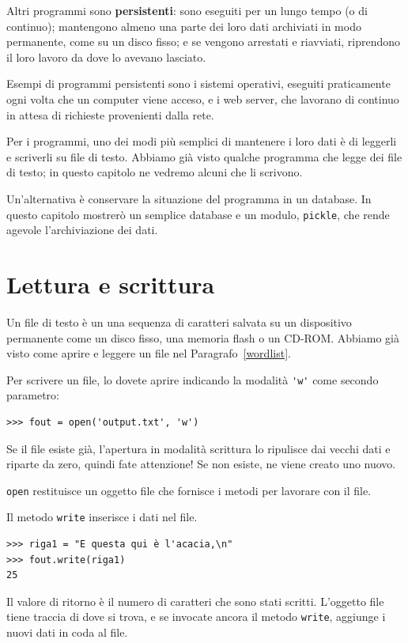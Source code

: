 \documentclass[10pt]{book}
\begin{document}
Altri programmi sono {\bf persistenti}: sono eseguiti per un lungo tempo (o di continuo); mantengono almeno una parte dei loro dati archiviati in modo permanente, come su un disco fisso; e se vengono arrestati e riavviati, riprendono il loro lavoro da dove lo avevano lasciato.

Esempi di programmi persistenti sono i sistemi operativi, eseguiti praticamente ogni volta che un computer viene acceso, e i web server, che lavorano di continuo in attesa di richieste provenienti dalla rete.

Per i programmi, uno dei modi più semplici di mantenere i loro dati è di leggerli e scriverli su file di testo. Abbiamo già visto qualche programma che legge dei file di testo; in questo capitolo ne vedremo alcuni che li scrivono.

Un'alternativa è conservare la situazione del programma in un database. In questo capitolo mostrerò un semplice database e un modulo, {\tt pickle}, che rende agevole l'archiviazione dei dati.


\section{Lettura e scrittura}

Un file di testo è un una sequenza di caratteri salvata su un dispositivo permanente come un disco fisso, una memoria flash o un CD-ROM. Abbiamo già visto come aprire e leggere un file nel Paragrafo~\ref{wordlist}.

Per scrivere un file, lo dovete aprire indicando la modalità \verb"'w'" come secondo parametro:

\begin{verbatim}
>>> fout = open('output.txt', 'w')
\end{verbatim}
%
Se il file esiste già, l'apertura in modalità scrittura lo ripulisce dai vecchi dati e riparte da zero, quindi fate attenzione! Se non esiste, ne viene creato uno nuovo.

{\tt open} restituisce un oggetto file che fornisce i metodi per lavorare con il file.

Il metodo {\tt write} inserisce i dati nel file.

\begin{verbatim}
>>> riga1 = "E questa qui è l'acacia,\n"
>>> fout.write(riga1)
25
\end{verbatim}
%
Il valore di ritorno è il numero di caratteri che sono stati scritti. L'oggetto file tiene traccia di dove si trova, e se invocate ancora il metodo {\tt write}, aggiunge i nuovi dati in coda al file.
\end{document}
